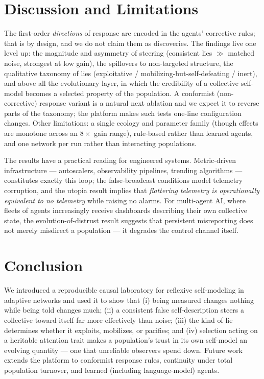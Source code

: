 \documentclass[10pt]{article}
\begin{document}
\section{Discussion and Limitations}
The first-order \emph{directions} of response are encoded in the agents'
corrective rules; that is by design, and we do not claim them as discoveries.
The findings live one level up: the magnitude and asymmetry of steering
(consistent lies $\gg$ matched noise, strongest at low gain), the spillovers
to non-targeted structure, the qualitative taxonomy of lies
(exploitative / mobilizing-but-self-defeating / inert), and above all the
evolutionary layer, in which the credibility of a collective self-model
becomes a selected property of the population. A conformist (non-corrective)
response variant is a natural next ablation and we expect it to reverse parts
of the taxonomy; the platform makes such tests one-line configuration changes.
Other limitations: a single ecology and parameter family (though effects are
monotone across an $8\times$ gain range), rule-based rather than learned
agents, and one network per run rather than interacting populations.

The results have a practical reading for engineered systems. Metric-driven
infrastructure --- autoscalers, observability pipelines, trending algorithms
--- constitutes exactly this loop; the false-broadcast conditions model
telemetry corruption, and the utopia result implies that \emph{flattering
telemetry is operationally equivalent to no telemetry} while raising no
alarms. For multi-agent AI, where fleets of agents increasingly receive
dashboards describing their own collective state, the evolution-of-distrust
result suggests that persistent misreporting does not merely misdirect a
population --- it degrades the control channel itself.

\section{Conclusion}
We introduced a reproducible causal laboratory for reflexive self-modeling in
adaptive networks and used it to show that (i) being measured changes nothing
while being told changes much; (ii) a consistent false self-description
steers a collective toward itself far more effectively than noise; (iii) the
kind of lie determines whether it exploits, mobilizes, or pacifies; and (iv)
selection acting on a heritable attention trait makes a population's trust in
its own self-model an evolving quantity --- one that unreliable observers
spend down. Future work extends the platform to conformist response rules,
continuity under total population turnover, and learned (including
language-model) agents.
\end{document}
